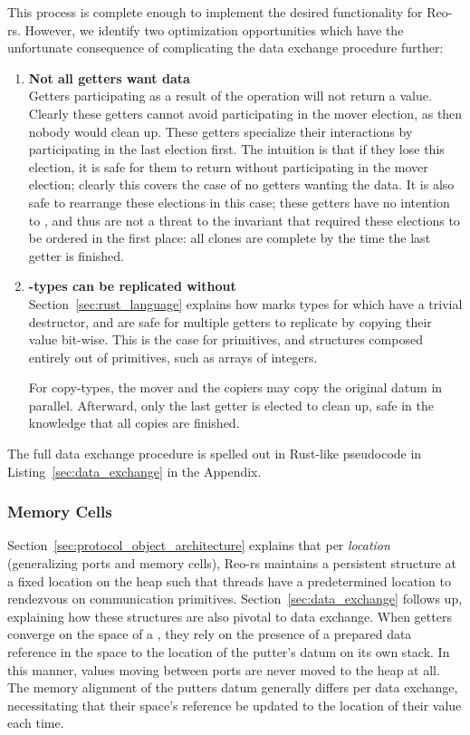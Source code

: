 This process is complete enough to implement the desired functionality for \mbox{Reo-rs}. However, we identify two optimization opportunities which have the unfortunate consequence of complicating the data exchange procedure further:
\begin{enumerate}
	\item \textbf{Not all getters want data}\\
	Getters participating as a result of the  operation will not return a value. Clearly these getters cannot avoid participating in the mover election, as then nobody would clean up. These getters specialize their interactions by participating in the last election first. The intuition is that if they lose this election, it is safe for them to return without participating in the mover election; clearly this covers the case of no getters wanting the data. It is also safe to rearrange these elections in this case; these getters have no intention to , and thus are not a threat to the invariant that required these elections to be ordered in the first place: all clones are complete by the time the last getter is finished.
	
	\item \textbf{-types can be replicated without }\\
	Section~\ref{sec:rust_language} explains how  marks types for which have a trivial destructor, and are safe for multiple getters to replicate by copying their value bit-wise. This is the case for primitives, and structures composed entirely out of primitives, such as arrays of integers. 
	
	For copy-types, the mover and the copiers may copy the original datum in parallel. Afterward, only the last getter is elected to clean up, safe in the knowledge that all copies are finished.
\end{enumerate}

The full data exchange procedure is spelled out in Rust-like pseudocode in Listing~\ref{sec:data_exchange} in the Appendix.

\subsubsection{Memory Cells}
\label{sec:memory_cells}
Section~\ref{sec:protocol_object_architecture} explains that per \textit{location} (generalizing ports and memory cells), Reo-rs maintains a persistent  structure at a fixed location on the heap such that threads have a predetermined location to rendezvous on communication primitives. Section~\ref{sec:data_exchange} follows up, explaining how these structures are also pivotal to data exchange. When getters converge on the space of a , they rely on the presence of a prepared data reference in the space to the location of the putter's datum on its own stack. In this manner, values moving between ports are never moved to the heap at all. The memory alignment of the putters datum generally differs per data exchange, necessitating that their space's reference be updated to the location of their value each time. 

